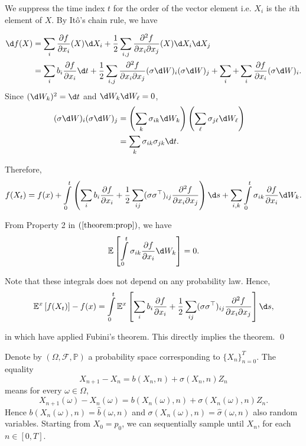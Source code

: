 We suppress the time index $t$ for the order of the vector element i.e. $X_i$ is the $i$th element of $X$. By Itô's chain rule, we have

\begin{align*}
    \d f(X)
     & =\sum\limits_{i}\dfrac{\partial f}{\partial x_i}(X)\d X_i+\dfrac{1}{2}\sum\limits_{i,j}\dfrac{\partial^2 f}{\partial x_i\partial x_j}(X)\d X_i\d X_j                                                                                           \\
     & =\sum\limits_{i}b_i\dfrac{\partial f}{\partial x_i}\d t+\dfrac{1}{2}\sum\limits_{i,j}\dfrac{\partial^2 f}{\partial x_i\partial x_j}(\sigma\d W)_i(\sigma\d W)_j+\sum\limits_{i}+\sum\limits_{i}\dfrac{\partial f}{\partial x_i}(\sigma\d W)_i.
\end{align*}
Since $(\d W_k)^2=\d t$ and $\d W_k\d W_\ell=0$,
\begin{align*}
    (\sigma\d W)_i(\sigma\d W)_j & = \left(\sum\limits_{k}\sigma_{ik}\d W_k\right)\left(\sum\limits_{\ell}\sigma_{j\ell}\d W_\ell\right) & \\
                                 & =\sum\limits_k \sigma_{ik} \sigma_{jk}\d t.
\end{align*}

Therefore,
\begin{align*}
    f(X_t)=f(x)+\int\limits_0^t\left(\sum\limits_{i}b_i\dfrac{\partial f}{\partial x_i}+\dfrac{1}{2}\sum\limits_{ij}(\sigma\sigma^\top)_{ij}\dfrac{\partial^2 f}{\partial x_i\partial x_j}\right)\d s + \sum\limits_{i,k}\int\limits_0^t\sigma_{ik}\dfrac{\partial f}{\partial x_i}\d W_k.
\end{align*}

From Property 2 in $(\ref{theorem:prop})$, we have
$$\mathbb{E}\left[\int\limits_0^t\sigma_{ik}\dfrac{\partial f}{\partial x_i}\d W_k\right]=0.$$

Note that these integrals does not depend on any probability law. Hence,
$$\mathbb{E}^x\left[f(X_t)\right] - f(x) = \int\limits_0^t\mathbb{E}^x\left[\sum\limits_{i}b_i\dfrac{\partial f}{\partial x_i}+\dfrac{1}{2}\sum\limits_{ij}(\sigma\sigma^\top)_{ij}\dfrac{\partial^2 f}{\partial x_i\partial x_j}\right]\d s,$$

in which have applied Fubini's theorem. This directly implies the theorem. \qed

Denote by $(\Omega, \mathcal{F}, \mathbb{P})$ a probability space corresponding to $\{X_n\}_{n=0}^T$. The equality
$$X_{n+1} - X_n = b(X_n,n) + \sigma(X_n,n)Z_n$$
means for every $\omega\in\Omega$,
$$X_{n+1}(\omega) - X_n(\omega) = b(X_n(\omega),n) + \sigma(X_n(\omega),n)Z_n.$$
Hence $b(X_n(\omega),n)=\hat{b}(\omega,n)$ and $\sigma(X_n(\omega),n) = \hat{\sigma} (\omega,n)$ also random variables. Starting from $X_0=p_0$, we can sequentially sample until $X_n$, for each $n\in[0,T]$.


